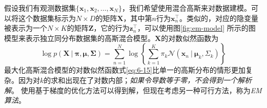 \documentclass[11pt]{ctexbook}
\begin{document}
假设我们有观测数据集$\{\bm x_1, \bm x_2, \ldots, \bm x_N\}$，我们希望使用混合高斯来对数据建模。可以将这个数据集标示为$N\times D$的矩阵$\bm X$，其中第$n$行为$\bm x_n^\top$。类似的，对应的隐变量被表示为一个$N\times K$的矩阵$\bm Z$，它的行为$\bm z_n^\top$，可以使用图\ref{fig:em-model} 所示的图模型来表示独立同分布数据集的高斯混合模型。$\bm X$的对数似然函数为
\begin{equation}
	\label{eq:6-15}
	\log p(\bm X\ |\ \bm \pi, \bm \mu, \bm \Sigma)=\sum_{n=1}^{N}\log\left\{ \sum_{k=1}^{K}\pi_k\mathcal N(\bm x_n\ |\ \bm \mu_k, \Sigma_k) \right\}
\end{equation}
最大化高斯混合模型的对数似然函数式\ref{eq:6-15}比单一的高斯分布的情形更加复杂。因为对$k$的求和出现在了对数内部；\emph{如果令导数等于零，不会得到一个解析解}。
使用基于梯度的优化方法可以得到解，但现在考虑另一种可行方法，称为\emph{EM算法}。
\end{document}
